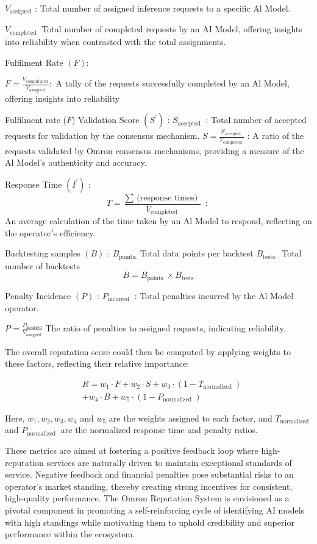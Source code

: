 \documentclass[conference]{IEEEtran}
\begin{document}
$V_{\text{assigned}}$ : Total number of assigned inference requests to a specific Al Model.

$V_{\text {completed }}$ Total number of completed requests by an AI Model, offering insights into reliability  when contrasted with the total assignments.

Fulfilment Rate $(F)$:

$F=\displaystyle \frac{V_{\text {complicated}}}{V_{\text {assigned}}}:$ A tally of the requests successfully completed by an Al Model, offering insights into reliability

Fulfilment rate ($F$)
Validation Score $\left(S^{\prime}\right)$ :
$S_{\text {accepted }}$ : Total number of accepted requests for validation by the consensus mechanism.
$S=\displaystyle \frac{S_{\text {accepted }}}{V_{\text {completed }}}$ : A ratio of the requests validated by Omron consensus mechanisms, providing a measure of the Al Model's authenticity and accuracy.

Response Time $\left(I^{\prime}\right)$ :
$$
T=\frac{\sum \text { (response times) }}{V_{\text {completed }}} \text { : }
$$
An average calculation of the time taken by an Al Model to respond, reflecting on the operator's efficiency.

Backtesting samples $(B)$ :
$B_{\text {points:}}$ Total data points per backtest
$B_{\text {tests: }}$ Total number of backtests
$$
B=B_{\text {points }} \times B_{\text {tests}}
$$

Penalty Incidence $(P)$ :
$P_{\text {incurred }}$ : Total penalties incurred by the Al Model operator. 

$P=\displaystyle \frac{P_{\text {incurred}}}{V_{\text {assigned}}}$ The ratio of penalties to assigned requests, indicating reliability.

The overall reputation score   could then be computed by applying weights to these factors, reflecting their relative importance:

$$
\begin{aligned}
& R=w_1 \cdot F+w_2 \cdot S+w_3 \cdot\left(1-T_{\text {normalized }}\right) \\ & +w_4 \cdot B+w_5 \cdot\left(1-P_{\text {normalized }}\right)
\end{aligned}
$$

Here, $w_1, w_2, w_3, w_4$ and $w_5$ are the weights assigned to each factor, and $T_{\text {normalized }}$ and $P_{\text {normalized }}$ are the normalized response time and penalty ratios.

These metrics are aimed at fostering a positive feedback loop where high-reputation services are naturally driven to maintain exceptional standards of service. Negative feedback and financial penalties pose substantial risks to an operator's market standing, thereby creating strong incentives for consistent, high-quality performance. The Omron Reputation System is envisioned as a pivotal component in promoting a self-reinforcing cycle of identifying AI models with high standings while motivating them to uphold credibility and superior performance within the ecosystem.
\end{document}
